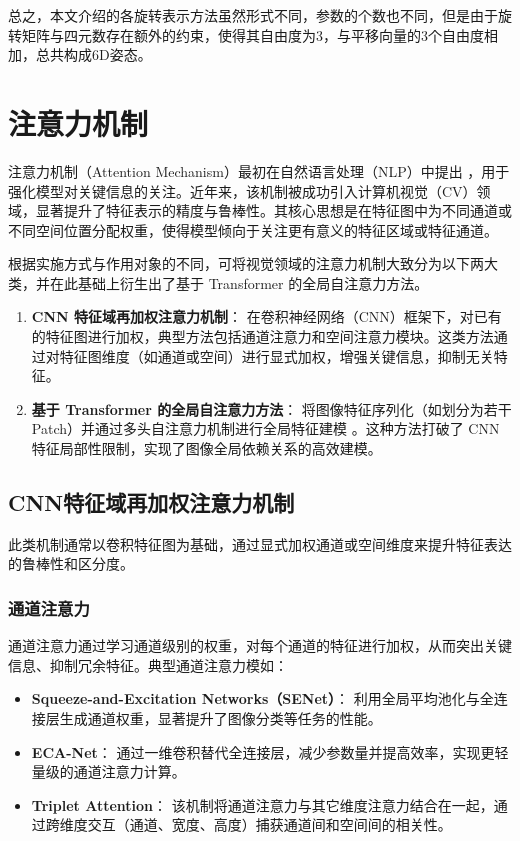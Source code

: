 总之，本文介绍的各旋转表示方法虽然形式不同，参数的个数也不同，但是由于旋转矩阵与四元数存在额外的约束，使得其自由度为3，与平移向量的3个自由度相加，总共构成6D姿态。


\section{注意力机制}
\label{sec:attention_mechanism}

注意力机制（Attention Mechanism）最初在自然语言处理（NLP）中提出 \cite{vaswani2017}，用于强化模型对关键信息的关注。近年来，该机制被成功引入计算机视觉（CV）领域，显著提升了特征表示的精度与鲁棒性。其核心思想是在特征图中为不同通道或不同空间位置分配权重，使得模型倾向于关注更有意义的特征区域或特征通道。

根据实施方式与作用对象的不同，可将视觉领域的注意力机制大致分为以下两大类，并在此基础上衍生出了基于 Transformer 的全局自注意力方法。

\begin{enumerate}
	\item \textbf{CNN 特征域再加权注意力机制}：
	在卷积神经网络（CNN）框架下，对已有的特征图进行加权，典型方法包括通道注意力和空间注意力模块。这类方法通过对特征图维度（如通道或空间）进行显式加权，增强关键信息，抑制无关特征。
	
	\item \textbf{基于 Transformer 的全局自注意力方法}：
	将图像特征序列化（如划分为若干 Patch）并通过多头自注意力机制进行全局特征建模 \cite{dosovitskiy2020image}。这种方法打破了 CNN 特征局部性限制，实现了图像全局依赖关系的高效建模。
\end{enumerate}

\subsection{CNN特征域再加权注意力机制}
此类机制通常以卷积特征图为基础，通过显式加权通道或空间维度来提升特征表达的鲁棒性和区分度。

\subsubsection{通道注意力}
通道注意力通过学习通道级别的权重，对每个通道的特征进行加权，从而突出关键信息、抑制冗余特征。典型通道注意力模如：
\begin{itemize}
	\item \textbf{Squeeze-and-Excitation Networks（SENet）}\cite{senet}：
	利用全局平均池化与全连接层生成通道权重，显著提升了图像分类等任务的性能。
	
	\item \textbf{ECA-Net}\cite{eca-net}：
	通过一维卷积替代全连接层，减少参数量并提高效率，实现更轻量级的通道注意力计算。
	
	\item \textbf{Triplet Attention}\cite{triplet}：
	该机制将通道注意力与其它维度注意力结合在一起，通过跨维度交互（通道、宽度、高度）捕获通道间和空间间的相关性。
\end{itemize}

